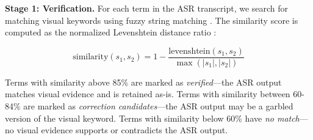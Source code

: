 %
%

\textbf{Stage 1: Verification.} For each term in the ASR transcript, we search for matching visual keywords using fuzzy string matching \cite{Cohen2003}. The similarity score is computed as the normalized Levenshtein distance ratio \cite{Levenshtein1966}:

\begin{equation}
\text{similarity}(s_1, s_2) = 1 - \frac{\text{levenshtein}(s_1, s_2)}{\max(|s_1|, |s_2|)}
\end{equation}

Terms with similarity above 85\% are marked as \textit{verified}---the ASR output matches visual evidence and is retained as-is. Terms with similarity between 60-84\% are marked as \textit{correction candidates}---the ASR output may be a garbled version of the visual keyword. Terms with similarity below 60\% have \textit{no match}---no visual evidence supports or contradicts the ASR output.

